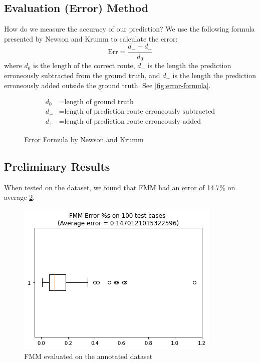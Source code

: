 \documentclass{article}
\numberwithin{equation}{section}
\theoremstyle{definition}
\begin{document}
\subsection{Evaluation (Error) Method} \label{Eval}
\label{sub:evaluation}

How do we measure the accuracy of our prediction? We use the following formula presented by Newson and Krumm \cite{newsonHiddenMarkovMap2009} to calculate the error:
$$\textrm{Err} = \frac{d_- + d_+}{d_0}$$ where $d_0$ is the length of the correct route, $d_-$ is the length the prediction erroneously subtracted from the ground truth, and $d_+$ is the length the prediction erroneously added outside the ground truth. See \autoref{fig:error-formula}.

\begin{figure}[ht]
    \centering
    \def\svgwidth{\linewidth}
    
    \begin{align*}
	    d_0 &= \text{length of ground truth}\\
	    d_- &= \text{length of prediction route erroneously subtracted}\\
	    d_{+} &= \text{length of prediction route erroneously added}
    \end{align*}
    \caption{Error Formula by Newson and Krumm}
    \label{fig:error-formula}
\end{figure}

\subsection{Preliminary Results}

When tested on the dataset, we found that FMM had an error of 14.7\% on average \ref{fig:fmmerror}.

\begin{figure}
    \centering
    \includegraphics[scale=.5]{Jupyter Notebook LaTeX/fmmerror.png}
    \caption{FMM evaluated on the annotated dataset}
    \label{fig:fmmerror}
\end{figure}
\end{document}
